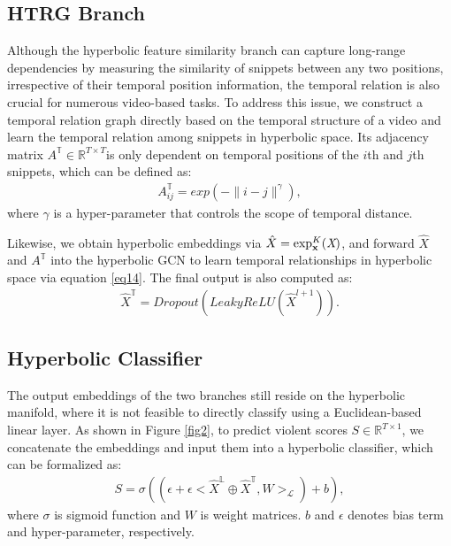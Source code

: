 \documentclass[sigconf]{acmart}
\newcommand{\expmap}[2]{\exp_\mathbf{#1}^K(\mathbf{#2})}
\begin{document}
\subsection{HTRG Branch}
Although the hyperbolic feature similarity branch can capture long-range dependencies by measuring the similarity of snippets between any two positions, irrespective of their temporal position information, the temporal relation is also crucial for numerous video-based tasks. To address this issue, we construct a temporal relation graph directly based on the temporal structure of a video and learn the temporal relation among snippets in hyperbolic space. Its adjacency matrix $A^{\mathbb{T}} \in \mathbb{R}^{T \times T} $is only dependent on temporal positions of the $i$th and $j$th snippets, which can be defined as:
\begin{align}
\label{eq16}
    A^{\mathbb{T}}_{ij} = exp(- \lVert i-j\rVert^{\gamma}),
\end{align}
where $\gamma$ is a hyper-parameter that controls the scope of temporal distance.

Likewise, we obtain hyperbolic embeddings via $\hat{X}=\expmap{x}{\emph{X}}$, and forward $\hat{X}$ and $A^{\mathbb{T}}$ into the hyperbolic GCN to learn temporal relationships in hyperbolic space via equation \ref{eq14}. The final output is also computed as:
\begin{align}
\label{eq17}
    \hat{X}^{\mathbb{T}} = Dropout(LeakyReLU(\hat{X}^{l+1})).
\end{align}




\subsection{Hyperbolic Classifier}
The output embeddings of the two branches still reside on the hyperbolic manifold, where it is not feasible to directly classify using a Euclidean-based linear layer. As shown in Figure \ref{fig2}, to predict violent scores $S\in \mathbb{R}^{T\times 1}$, we concatenate the embeddings and input them into a hyperbolic classifier, which can be formalized as:
\begin{align}
\label{eq18}
S = \sigma((\epsilon + \epsilon <\hat{X}^{\mathbb{L}} \oplus \hat{X}^{\mathbb{T}}, W>_{\mathcal{L}}) + b),
\end{align}
where $\sigma$ is sigmoid function and $W$ is weight matrices. $b$ and $\epsilon$ denotes bias term and hyper-parameter, respectively.
\end{document}
